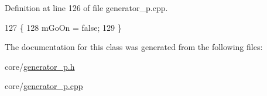 Definition at line 126 of file generator\+\_\+p.\+cpp.


\begin{DoxyCode}
127 \{
128     mGoOn = \textcolor{keyword}{false};
129 \}
\end{DoxyCode}


The documentation for this class was generated from the following files\+:\begin{DoxyCompactItemize}
\item 
core/\hyperlink{generator__p_8h}{generator\+\_\+p.\+h}\item 
core/\hyperlink{generator__p_8cpp}{generator\+\_\+p.\+cpp}\end{DoxyCompactItemize}
